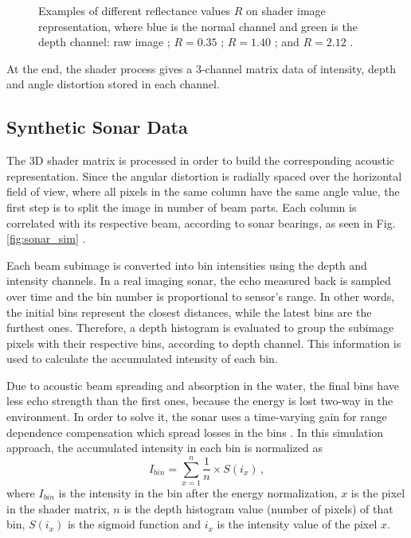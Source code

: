 \documentclass[final,5p,times]{elsarticle}
\begin{document}
\begin{figure}[h]
{        \label{fig:reflectance:2.12}
    }
    \captionsetup{justification=centering}
    \caption{Examples of different reflectance values $R$ on shader image representation, where blue is the normal channel and green is the depth channel: raw image ; $R = 0.35$ ; $R = 1.40$ ; and $R = 2.12$ .}
    \label{fig:sonar_reflectances}
\end{figure}

At the end, the shader process gives a 3-channel matrix data of intensity, depth and angle distortion stored in each channel.


\subsection{Synthetic Sonar Data}
\label{dev:sonardata}

The 3D shader matrix is processed in order to build the corresponding acoustic representation. Since the angular distortion is radially spaced over the horizontal field of view, where all pixels in the same column have the same angle value, the first step is to split the image in number of beam parts. Each column is correlated with its respective beam, according to sonar bearings, as seen in Fig. \ref{fig:sonar_sim} .

Each beam subimage is converted into bin intensities using the depth and intensity channels. In a real imaging sonar, the echo measured back is sampled over time and the bin number is proportional to sensor's range. In other words, the initial bins represent the closest distances, while the latest bins are the furthest ones. Therefore, a depth histogram is evaluated to group the subimage pixels with their respective bins, according to depth channel. This information is used to calculate the accumulated intensity of each bin.

Due to acoustic beam spreading and absorption in the water, the final bins have less echo strength than the first ones, because the energy is lost two-way in the environment. In order to solve it, the sonar uses a time-varying gain for range dependence compensation which spread losses in the bins \cite{urick2013}. In this simulation approach, the accumulated intensity in each bin is normalized as
\begin{equation}
    \label{eq:1}
    I_{bin} = \sum\limits_{x=1}^n \frac{1}{n} \times S(i_{x}) \, ,
\end{equation}
where $I_{bin}$ is the intensity in the bin after the energy normalization, $x$ is the pixel in the shader matrix, $n$ is the depth histogram value (number of pixels) of that bin, $S(i_{x})$ is the sigmoid function and $i_{x}$ is the intensity value of the pixel $x$.
\end{document}
